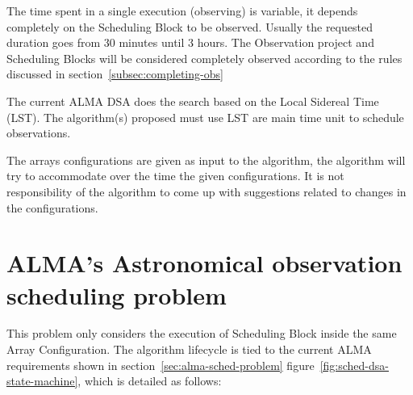 The time spent in a single execution (observing) is variable, it depends completely on the Scheduling Block to be observed. Usually the requested duration goes from 30 minutes until 3 hours. The Observation project and Scheduling Blocks will be considered completely observed according to the rules discussed in section~\ref{subsec:completing-obs} 

The current ALMA DSA does the search based on the Local Sidereal Time (LST). The algorithm(s) proposed must use LST are main time unit to schedule observations.

The arrays configurations are given as input to the algorithm, the algorithm will try to accommodate over the time the given configurations. It is not responsibility of the algorithm to come up with suggestions related to changes in the configurations.
 
\chapter{ALMA's Astronomical observation scheduling problem}
\label{sec:astro-schedule-problem}
This problem only considers the execution of Scheduling Block inside the same Array Configuration. The algorithm lifecycle is tied to the current ALMA requirements shown in section~\ref{sec:alma-sched-problem} figure~\ref{fig:sched-dsa-state-machine}, which is detailed as follows:

